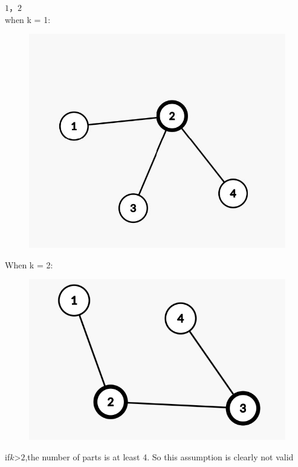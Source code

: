 \documentclass[a4paper, justified]{tufte-handout}
\begin{document}
\begin{problem}[CZ 5.12]
\end{problem}

\begin{solution}
  $1$，$2$\\
  \noindent when k = 1:\\
  \begin{figure}[htbp]
    \centering
    \includegraphics[width = 0.30\linewidth]{figs/b.jpg}
  \end{figure}
  When k = 2:
  \begin{figure}[htbp]
    \centering
    \includegraphics[width = 0.30\linewidth]{figs/c.png}
  \end{figure}

  if$k$>$2$,the number of parts is at least 4. So this assumption is clearly not valid\\
\end{solution}

\begin{problem}[CZ 5.18]
\end{problem}
\end{document}
